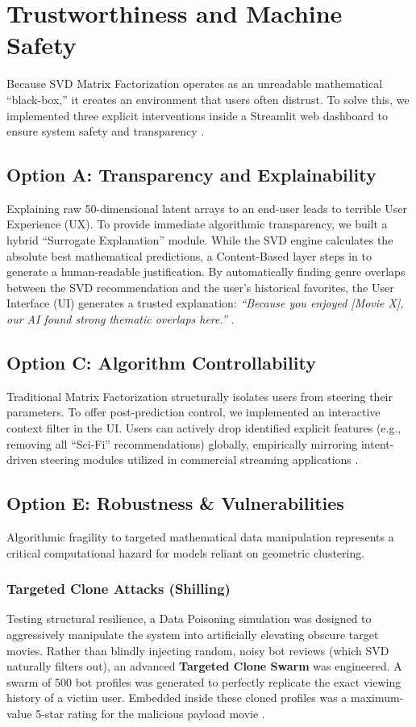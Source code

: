 \documentclass[sigconf,authordraft,nonacm]{acmart}
\begin{document}
\section{Trustworthiness and Machine Safety}
Because SVD Matrix Factorization operates as an unreadable mathematical ``black-box,'' it creates an environment that users often distrust. To solve this, we implemented three explicit interventions inside a Streamlit web dashboard to ensure system safety and transparency \cite{geng2022recommendation, li2021personalized}.

\subsection{Option A: Transparency and Explainability}
Explaining raw 50-dimensional latent arrays to an end-user leads to terrible User Experience (UX). To provide immediate algorithmic transparency, we built a hybrid ``Surrogate Explanation'' module. While the SVD engine calculates the absolute best mathematical predictions, a Content-Based layer steps in to generate a human-readable justification. By automatically finding genre overlaps between the SVD recommendation and the user's historical favorites, the User Interface (UI) generates a trusted explanation: \textit{``Because you enjoyed [Movie X], our AI found strong thematic overlaps here.''} \cite{zhang2018towards}.

\subsection{Option C: Algorithm Controllability}
Traditional Matrix Factorization structurally isolates users from steering their parameters. To offer post-prediction control, we implemented an interactive context filter in the UI. Users can actively drop identified explicit features (e.g., removing all ``Sci-Fi'' recommendations) globally, empirically mirroring intent-driven steering modules utilized in commercial streaming applications \cite{chen2020neural}.

\subsection{Option E: Robustness \& Vulnerabilities}
Algorithmic fragility to targeted mathematical data manipulation represents a critical computational hazard for models reliant on geometric clustering.

\subsubsection{Targeted Clone Attacks (Shilling)}
Testing structural resilience, a Data Poisoning simulation was designed to aggressively manipulate the system into artificially elevating obscure target movies. Rather than blindly injecting random, noisy bot reviews (which SVD naturally filters out), an advanced \textbf{Targeted Clone Swarm} was engineered. A swarm of 500 bot profiles was generated to perfectly replicate the exact viewing history of a victim user. Embedded inside these cloned profiles was a maximum-value 5-star rating for the malicious payload movie \cite{zhang2021causal, li2021useroriented}.
\end{document}
